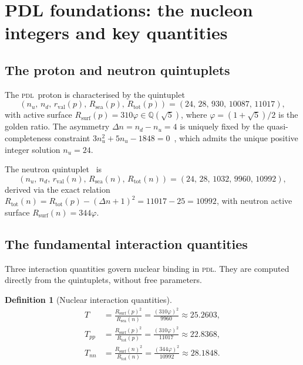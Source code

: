 \documentclass{article}
\newtheorem{definition}[theorem]{Definition}
\theoremstyle{remark}
\newcommand{\PDL}{\textsc{pdl}}
\newcommand{\Rsurf}{R_{\mathrm{surf}}}
\newcommand{\Rsea}{R_{\mathrm{sea}}}
\newcommand{\Rtot}{R_{\mathrm{tot}}}
\newcommand{\rval}{r_{\mathrm{val}}}
\newcommand{\Tpp}{T_{pp}}
\newcommand{\Tnn}{T_{nn}}
\newcommand{\Deltanop}{\Delta n}
\newcommand{\vp}{\varphi}
\begin{document}
\section{PDL foundations: the nucleon integers and key quantities}
\label{sec:foundations}

\subsection{The proton and neutron quintuplets}

The \PDL\ proton is characterised by the quintuplet
\begin{equation}
  (n_u,\, n_d,\, \rval(p),\, \Rsea(p),\, \Rtot(p)) = (24,\, 28,\, 930,\, 10087,\, 11017),
  \label{eq:proton_quintuplet}
\end{equation}
with active surface $\Rsurf(p) = 310\vp \in \mathbb{Q}(\sqrt{5})$, where $\vp = (1+\sqrt{5})/2$ is the golden ratio. The asymmetry $\Deltanop = n_d - n_u = 4$ is uniquely fixed by the quasi-completeness constraint $3n_u^2 + 5n_u - 1848 = 0$~\cite{D25}, which admits the unique positive integer solution $n_u = 24$.

The neutron quintuplet~\cite{D22} is
\begin{equation}
  (n_u,\, n_d,\, \rval(n),\, \Rsea(n),\, \Rtot(n)) = (24,\, 28,\, 1032,\, 9960,\, 10992),
  \label{eq:neutron_quintuplet}
\end{equation}
derived via the exact relation $\Rtot(n) = \Rtot(p) - (\Deltanop+1)^2 = 11017 - 25 = 10992$, with neutron active surface $\Rsurf(n) = 344\vp$.

\subsection{The fundamental interaction quantities}

Three interaction quantities govern nuclear binding in \PDL. They are computed directly from the quintuplets, without free parameters.

\begin{definition}[Nuclear interaction quantities]
\label{def:TT}
\begin{align}
  T &= \frac{\Rsurf(p)^2}{\Rsea(n)} = \frac{(310\vp)^2}{9960} \approx 25.2603, \label{eq:T}\\[4pt]
  \Tpp &= \frac{\Rsurf(p)^2}{\Rtot(p)} = \frac{(310\vp)^2}{11017} \approx 22.8368, \label{eq:Tpp}\\[4pt]
  \Tnn &= \frac{\Rsurf(n)^2}{\Rtot(n)} = \frac{(344\vp)^2}{10992} \approx 28.1848. \label{eq:Tnn}
\end{align}
\end{definition}
\end{document}
